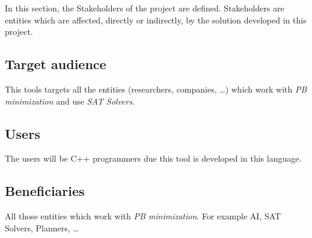 In this section, the Stakeholders of the project are defined. Stakeholders are entities which are affected, directly or indirectly, by the solution developed in this project. 
\subsection{Target audience}
This tools targets all the entities (researchers, companies, \ldots) which work with \emph{PB minimization} and use \emph{SAT Solvers}.
\subsection{Users}
The users will be C++ programmers due this tool is developed in this language.
\subsection{Beneficiaries}
All those entities which work with \emph{PB minimization}. For example AI, SAT Solvers, Planners, \ldots